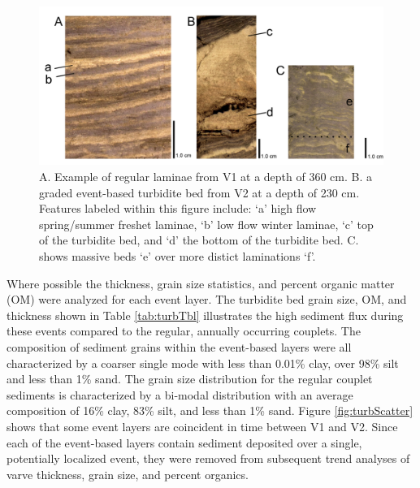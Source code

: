 \documentclass[Royal,times,doublespace,sageh]{sagej}
\begin{document}
\begin{figure}

{\centering \includegraphics[width=1\linewidth]{figs/good_vs_flood_vs_disturbed_varves_} 

}

\caption{A. Example of regular laminae from V1 at a depth of 360 cm. B. a graded event-based turbidite bed from V2 at a depth of 230 cm. Features labeled within this figure include: ‘a’ high flow spring/summer freshet laminae, ‘b’ low flow winter laminae, ‘c’  top of the turbidite bed, and ‘d’ the bottom of the turbidite bed. C. shows massive beds ‘e’ over more distict laminations ‘f’.\label{tab:varve-turb}}\label{fig:varve-turb}
\end{figure}

Where possible the thickness, grain size statistics, and percent organic
matter (OM) were analyzed for each event layer. The turbidite bed grain
size, OM, and thickness shown in Table \ref{tab:turbTbl} illustrates the
high sediment flux during these events compared to the regular, annually
occurring couplets. The composition of sediment grains within the
event-based layers were all characterized by a coarser single mode with
less than 0.01\% clay, over 98\% silt and less than 1\% sand. The grain
size distribution for the regular couplet sediments is characterized by
a bi-modal distribution with an average composition of 16\% clay, 83\%
silt, and less than 1\% sand. Figure \ref{fig:turbScatter} shows that
some event layers are coincident in time between V1 and V2. Since each
of the event-based layers contain sediment deposited over a single,
potentially localized event, they were removed from subsequent trend
analyses of varve thickness, grain size, and percent organics.
\end{document}
